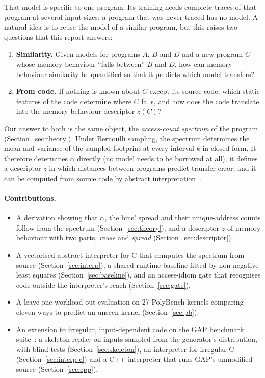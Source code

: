 \documentclass[11pt]{article}
\newcommand{\term}[1]{\emph{#1}}
\newcommand{\secref}[1]{Section~\ref{#1}}
\begin{document}
That model is specific to one program. Its training needs complete traces of that program at several input sizes;
a program that was never traced has no model. A natural idea is to reuse the model of a similar program, but this
raises two questions that this report answers:

\begin{enumerate}
\item \textbf{Similarity.} Given models for programs $A$, $B$ and $D$ and a new program $C$ whose memory behaviour
``falls between'' $B$ and $D$, how can memory-behaviour similarity be quantified so that it predicts which model
transfers?
\item \textbf{From code.} If nothing is known about $C$ except its source code, which static features of the code
determine where $C$ falls, and how does the code translate into the memory-behaviour descriptor $z(C)$?
\end{enumerate}

Our answer to both is the same object, the \term{access-count spectrum} of the program (\secref{sec:theory}). Under
Bernoulli sampling, the spectrum determines the mean and variance of the sampled footprint at every interval $k$ in
closed form. It therefore determines $\alpha$ directly (no model needs to be borrowed at all), it defines a
descriptor $z$ in which distances between programs predict transfer error, and it can be computed from source code by
abstract interpretation~\cite{cousot1977}.

\paragraph{Contributions.}
\begin{itemize}
\item A derivation showing that $\alpha$, the bins' spread and their unique-address counts follow from the spectrum
(\secref{sec:theory}), and a descriptor $z$ of memory behaviour with two parts, \term{reuse} and \term{spread}
(\secref{sec:descriptor}).
\item A vectorised abstract interpreter for C that computes the spectrum from source (\secref{sec:interp}), a
shared runtime baseline fitted by non-negative least squares (\secref{sec:baseline}), and an access-idiom gate that
recognises code outside the interpreter's reach (\secref{sec:gate}).
\item A leave-one-workload-out evaluation on 27 PolyBench kernels comparing eleven ways to predict an unseen kernel
(\secref{sec:pb}).
\item An extension to irregular, input-dependent code on the GAP benchmark suite~\cite{beamer2015gap}: a skeleton
replay on inputs sampled from the generator's distribution, with blind tests (\secref{sec:skeleton}), an
interpreter for irregular C (\secref{sec:interp-c}) and a C++ interpreter that runs GAP's unmodified source
(\secref{sec:cpp}).
\end{itemize}
\end{document}
